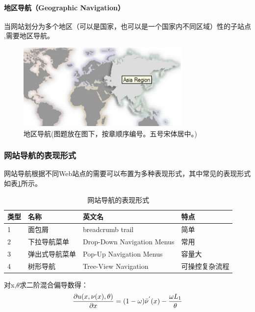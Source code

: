 \paragraph{地区导航（Geographic Navigation）}
\par 当网站划分为多个地区（可以是国家，也可以是一个国家内不同区域）性的子站点\citep{宫琳2017基于专利信息的产品方案竞争力评价方法} ,需要地区导航。
\begin {figure}[htbp]
\centering
\includegraphics {figure/map.jpg}
\caption{\songti {}地区导航(图题放在图下，按章顺序编号。五号宋体居中。)}
\label{fig:map}
\end{figure}

\subsubsection{网站导航的表现形式}
\par 网站导航根据不同Web站点的需要可以布置为多种表现形式，其中常见的表现形式如表\ref{tab:1}所示。
\begin{table}[htbp]
\centering
\caption{\heiti {}网站导航的表现形式}
\label{tab:1}
\begin{tabular}{llll}
	\toprule
	类型  &名称  &  英文名  & 特点  \\
	\midrule
	1  &    面包屑  &  breadcrumb trail & 简单 \\
	2  &  下拉导航菜单  & Drop-Down Navigation Menus  & 常用 \\
	3  &   弹出式导航菜单  &  Pop-Up Navigation Menus &  容量大 \\
	4  &  树形导航  &  Tree-View Navigation & 可操控复杂流程 \\
	\bottomrule
\end{tabular}
\end{table}
	
\par 对x,$\theta$求二阶混合偏导数得： \\
\begin{equation}
\centering
 \frac{\partial u(x,\nu(x),\theta)}{\partial x} = (1-\omega)\bar \nu^{'}(x)-\frac{\omega L_1}{\theta}
\end{equation}